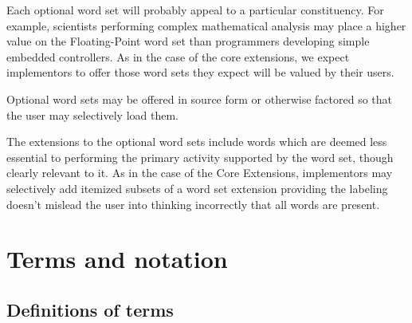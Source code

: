Each optional word set will probably appeal to a particular
constituency. For example, scientists performing complex mathematical
analysis may place a higher value on the Floating-Point word set than
programmers developing simple embedded controllers. As in the case of
the core extensions, we expect implementors to offer those word sets
they expect will be valued by their users.

Optional word sets may be offered in source form or otherwise
factored so that the user may selectively load them.

The extensions to the optional word sets include words which are
deemed less essential to performing the primary activity supported
by the word set, though clearly relevant to it. As in the case of
the Core Extensions, implementors may selectively add itemized
subsets of a word set extension providing the labeling doesn't
mislead the user into thinking incorrectly that all words are
present.


\section{Terms and notation} %

\subsection{Definitions of terms} %

